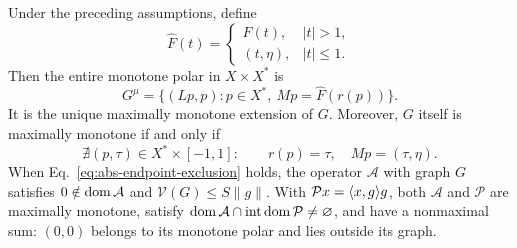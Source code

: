 \renewcommand{\thetheorem}{E}
\begin{theorem}
\label{thm:endpoint-criterion}
Under the preceding assumptions, define
\[
\widehat F(t)=
\begin{cases}
F(t),&|t|>1,\\
(t,\eta),&|t|\le1.
\end{cases}
\]
Then the entire monotone polar in $X\times X^*$ is
\begin{equation}
G^\mu=\{(Lp,p):p\in X^*,\ Mp=\widehat F(r(p))\}.
\label{eq:abs-entire-polar}
\end{equation}
It is the unique maximally monotone extension of $G$. Moreover, $G$
itself is maximally monotone if and only if
\begin{equation}
\nexists(p,\tau)\in X^*\times[-1,1]:
\qquad r(p)=\tau,\quad Mp=(\tau,\eta).
\label{eq:abs-endpoint-exclusion}
\end{equation}
When Eq.~\eqref{eq:abs-endpoint-exclusion} holds, the operator
$\mathcal A$ with graph $G$ satisfies $0\notin\operatorname{dom}\mathcal A$ and
$\mathcal V(G)\le S\|g\|$. With
$\mathcal P x=\langle x,g\rangle g$, both $\mathcal A$ and $\mathcal P$
are maximally monotone, satisfy
$\operatorname{dom}\mathcal A\cap\operatorname{int}\operatorname{dom}\mathcal P\ne\varnothing$,
and have a nonmaximal sum: $(0,0)$ belongs to its monotone polar
and lies outside its graph.
\end{theorem}
